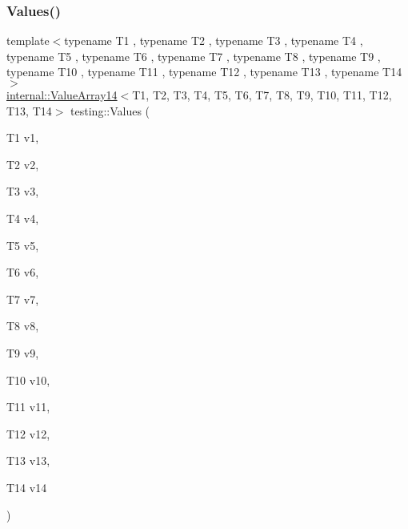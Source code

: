 \subsubsection{\texorpdfstring{Values()}{Values()}\hspace{0.1cm}{\footnotesize\ttfamily [15/51]}}
{\footnotesize\ttfamily template$<$typename T1 , typename T2 , typename T3 , typename T4 , typename T5 , typename T6 , typename T7 , typename T8 , typename T9 , typename T10 , typename T11 , typename T12 , typename T13 , typename T14 $>$ \\
\mbox{\hyperlink{classtesting_1_1internal_1_1_value_array14}{internal\+::\+Value\+Array14}}$<$T1, T2, T3, T4, T5, T6, T7, T8, T9, T10, T11, T12, T13, T14$>$ testing\+::\+Values (\begin{DoxyParamCaption}\item[{T1}]{v1,  }\item[{T2}]{v2,  }\item[{T3}]{v3,  }\item[{T4}]{v4,  }\item[{T5}]{v5,  }\item[{T6}]{v6,  }\item[{T7}]{v7,  }\item[{T8}]{v8,  }\item[{T9}]{v9,  }\item[{T10}]{v10,  }\item[{T11}]{v11,  }\item[{T12}]{v12,  }\item[{T13}]{v13,  }\item[{T14}]{v14 }\end{DoxyParamCaption})}

\mbox{\label{namespacetesting_ab0c1943e4f680df0d92c695ed0ac36df}} 
